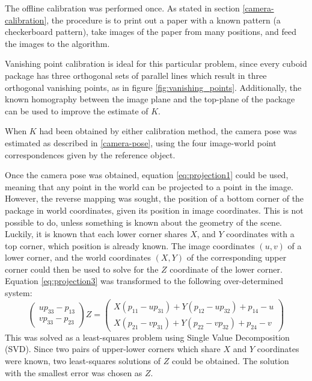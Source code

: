 The offline calibration was performed once.
As stated in section \ref{camera-calibration}, the procedure is to print out a paper with a known pattern (a checkerboard pattern), take images of the paper from many positions, and feed the images to the algorithm.

Vanishing point calibration is ideal for this particular problem, since every cuboid package has three orthogonal sets of parallel lines which result in three orthogonal vanishing points, as in figure \ref{fig:vanishing_points}.
Additionally, the known homography between the image plane and the top-plane of the package can be used to improve the estimate of $K$.

When $K$ had been obtained by either calibration method, the camera pose was estimated as described in \ref{camera-pose}, using the four image-world point correspondences given by the reference object. %

Once the camera pose was obtained, equation \ref{eq:projection1} could be used, meaning that any point in the world can be projected to a point in the image.
However, the reverse mapping was sought, the position of a bottom corner of the package in world coordinates, given its position in image coordinates.
This is not possible to do, unless something is known about the geometry of the scene.
Luckily, it is known that each lower corner shares $X$, and $Y$ coordinates with a top corner, which position is already known.
The image coordinates $(u,v)$ of a lower corner, and the world coordinates $(X,Y)$ of the corresponding upper corner could then be used to solve for the $Z$ coordinate of the lower corner. 
Equation \ref{eq:projection3} was transformed to the following over-determined system:
\begin{equation} \label{eq:constrained-projection}
\begin{pmatrix} up_{33}-p_{13} \\ vp_{33}-p_{23} \end{pmatrix} Z = 
\begin{pmatrix}
X(p_{11}-up_{31}) + Y(p_{12}-up_{32})+p_{14}-u \\
X(p_{21}-vp_{31}) + Y(p_{22}-vp_{32})+p_{24}-v
\end{pmatrix}
\end{equation}
This was solved as a least-squares problem using Single Value Decomposition (SVD).
Since two pairs of upper-lower corners which share $X$ and $Y$ coordinates were known, two least-squares solutions of $Z$ could be obtained.
The solution with the smallest error was chosen as $Z$.

